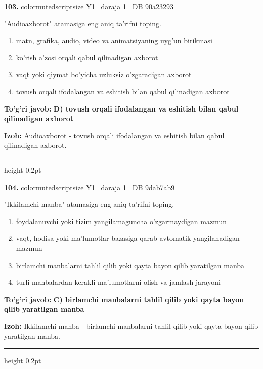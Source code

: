 \documentclass[10pt,a4paper,oneside]{article}
\begin{document}
\noindent\textbf{\color{ink}103.}  {color{muted}scriptsize Y1 \textbullet\ daraja 1 \textbullet\ DB 90a23293}
\par
"Audioaxborot" atamasiga eng aniq ta'rifni toping.
\begin{enumerate}[label=\Alph*),leftmargin=9mm]
\item matn, grafika, audio, video va animatsiyaning uyg'un birikmasi
\item ko'rish a'zosi orqali qabul qilinadigan axborot
\item vaqt yoki qiymat bo'yicha uzluksiz o'zgaradigan axborot
\item tovush orqali ifodalangan va eshitish bilan qabul qilinadigan axborot
\end{enumerate}
\begin{tcolorbox}[enhanced,breakable,colback=teal!4,colframe=teal!50!black,boxrule=0.5pt,arc=1.1mm,left=3mm,right=3mm,top=1.7mm,bottom=1.7mm,before skip=2mm,after skip=2mm]
\textbf{\color{teal}To'g'ri javob:} \textbf{D) tovush orqali ifodalangan va eshitish bilan qabul qilinadigan axborot}
\par\smallskip
\textbf{Izoh:} Audioaxborot - tovush orqali ifodalangan va eshitish bilan qabul qilinadigan axborot.
\end{tcolorbox}
\vspace{2mm}\hrule height 0.2pt \vspace{3mm}

\noindent\textbf{\color{ink}104.}  {color{muted}scriptsize Y1 \textbullet\ daraja 1 \textbullet\ DB 9dab7ab9}
\par
"Ikkilamchi manba" atamasiga eng aniq ta'rifni toping.
\begin{enumerate}[label=\Alph*),leftmargin=9mm]
\item foydalanuvchi yoki tizim yangilamaguncha o'zgarmaydigan mazmun
\item vaqt, hodisa yoki ma'lumotlar bazasiga qarab avtomatik yangilanadigan mazmun
\item birlamchi manbalarni tahlil qilib yoki qayta bayon qilib yaratilgan manba
\item turli manbalardan kerakli ma'lumotlarni olish va jamlash jarayoni
\end{enumerate}
\begin{tcolorbox}[enhanced,breakable,colback=teal!4,colframe=teal!50!black,boxrule=0.5pt,arc=1.1mm,left=3mm,right=3mm,top=1.7mm,bottom=1.7mm,before skip=2mm,after skip=2mm]
\textbf{\color{teal}To'g'ri javob:} \textbf{C) birlamchi manbalarni tahlil qilib yoki qayta bayon qilib yaratilgan manba}
\par\smallskip
\textbf{Izoh:} Ikkilamchi manba - birlamchi manbalarni tahlil qilib yoki qayta bayon qilib yaratilgan manba.
\end{tcolorbox}
\vspace{2mm}\hrule height 0.2pt \vspace{3mm}
\end{document}
